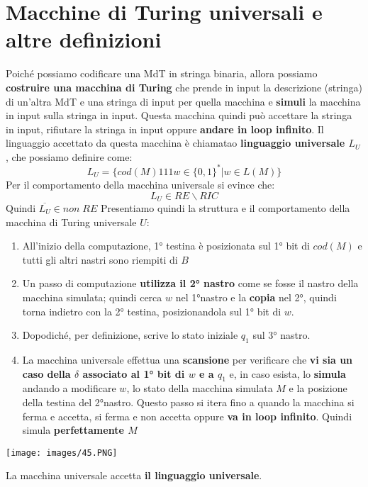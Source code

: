 \documentclass[12pt]{article}
\begin{document}
\section{Macchine di Turing universali e altre definizioni}
Poiché possiamo codificare una MdT in stringa binaria, allora possiamo \textbf{costruire una macchina di Turing} che prende in input la descrizione (stringa) di un'altra MdT e una stringa di input per quella macchina e \textbf{simuli} la macchina in input sulla stringa in input. Questa macchina quindi può accettare la stringa in input, rifiutare la stringa in input oppure \textbf{andare in loop infinito}. Il linguaggio accettato da questa macchina è chiamatao \textbf{linguaggio universale $L_U$}, che possiamo definire come:
$$L_U = \{cod(M)111w \in \{0, 1\}^*|w \in L(M)\}$$
Per il comportamento della macchina universale si evince che:
$$L_U \in RE \backslash RIC$$
Quindi $\overline{L_U} \in non \; RE$
Presentiamo quindi la struttura e il comportamento della macchina di Turing universale $U$:
\begin{enumerate}
    \item All'inizio della computazione, 1° testina è posizionata sul 1° bit di $cod(M)$ e tutti gli altri nastri sono riempiti di $B$
    \item Un passo di computazione \textbf{utilizza il 2° nastro} come se fosse il nastro della macchina simulata; quindi cerca $w$ nel 1°nastro e la \textbf{copia} nel 2°, quindi torna indietro con la 2° testina, posizionandola sul 1° bit di $w$.
    \item Dopodiché, per definizione, scrive lo stato iniziale $q_1$ sul 3° nastro.
    \item La macchina universale effettua una \textbf{scansione} per verificare che \textbf{vi sia un caso della $\delta$ associato al 1° bit di $w$ e a $q_1$} e, in caso esista, lo \textbf{simula} andando a modificare $w$, lo stato della macchina simulata $M$ e la posizione della testina del 2°nastro. Questo passo si itera fino a quando la macchina si ferma e accetta, si ferma e non accetta oppure \textbf{va in loop infinito}. Quindi simula \textbf{perfettamente $M$}
\end{enumerate}
\begin{center}
    \texttt{[image: images/45.PNG]}
\end{center}
La macchina universale accetta \textbf{il linguaggio universale}.
\end{document}
